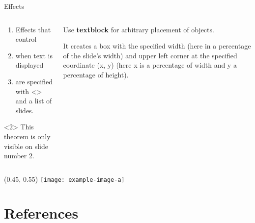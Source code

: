 \documentclass[UKenglish]{beamer}
\begin{document}
\begin{frame}{Effects}
    \begin{columns}[onlytextwidth]
        \begin{column}{0.49\textwidth}
            \begin{enumerate}[<+-|alert@+>]
                \item
                Effects that control

                \item
                when text is displayed

                \item
                are specified with <> and a list of slides.
            \end{enumerate}

            \begin{theorem}<2>
                This theorem is only visible on slide number 2.
            \end{theorem}
        \end{column}
        \begin{column}{0.49\textwidth}
            Use \textbf<2->{textblock} for arbitrary placement of objects.

            \pause
            \medskip

            It creates a box
            with the specified width (here in a percentage of the slide's width)
            and upper left corner at the specified coordinate (x, y)
            (here x is a percentage of width and y a percentage of height).
        \end{column}
    \end{columns}
    
    {
        \begin{textblock}{0.3}(0.45, 0.55)
            \texttt{[image: example-image-a]}
        \end{textblock}
    }
\end{frame}

\section{References}
\end{document}

